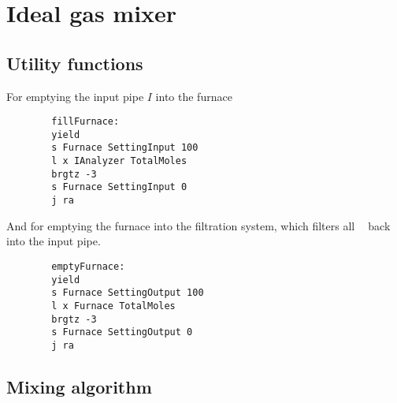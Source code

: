 \documentclass{article}
\DeclareMathOperator{\CDiox}{\mathrm{CO}_2}
\begin{document}
\section{Ideal gas mixer}

\subsection{Utility functions}

\begin{multicols}{2}
    \noindent
    For emptying the input pipe $I$ into the furnace
    \columnbreak
    \begin{verbatim}
        fillFurnace:
        yield
        s Furnace SettingInput 100
        l x IAnalyzer TotalMoles
        brgtz -3
        s Furnace SettingInput 0
        j ra
    \end{verbatim}
\end{multicols}

\begin{multicols}{2}
    \noindent
    And for emptying the furnace into the filtration system, which filters all
    $\CDiox$ back into the input pipe.
    \columnbreak
    \begin{verbatim}
        emptyFurnace:
        yield
        s Furnace SettingOutput 100
        l x Furnace TotalMoles
        brgtz -3
        s Furnace SettingOutput 0
        j ra
    \end{verbatim}
\end{multicols}

\subsection{Mixing algorithm}
\end{document}
